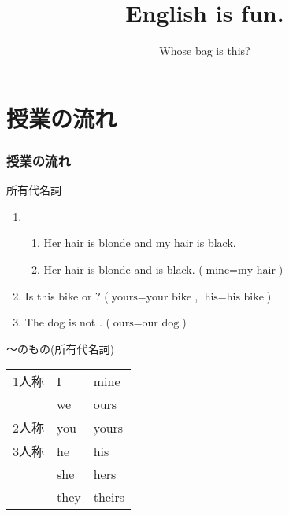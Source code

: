 \documentclass[aspectratio=169,xcolor={dvipsnames,table}]{beamer}
\title{English is fun.}
\subtitle{Whose bag is this?}
\author{}
\institute[]{}
\date[]
\begin{document}
\begin{frame}[plain]
  \titlepage
\end{frame}

\section*{授業の流れ}
\begin{frame}[plain]
  \frametitle{授業の流れ}
  \tableofcontents
\end{frame}

\begin{frame}[plain]{所有代名詞}
 
\begin{enumerate}
 \item \begin{enumerate}
	\item Her hair is blonde and my hair is black.
	\item Her hair is blonde and  is black. ($\text{mine} = \text{my hair}$)
       \end{enumerate}
 \item Is this bike  or ? ($\text{yours} = \text{your bike}$, $\text{his} = \text{his bike}$)
 \item The dog is not . ($\text{ours} = \text{our dog}$)
\end{enumerate}


\end{frame}
\begin{frame}[plain]{〜のもの(所有代名詞)}
 
 \begin{center}
\begin{tabular}{lll}\toprule
1人称&I&mine\\
&we&ours\\
2人称&you&yours\\
3人称&he&his\\
&she&hers\\
&they&theirs\\
\bottomrule
\end{tabular}
\end{center}
\end{frame}
\end{document}
